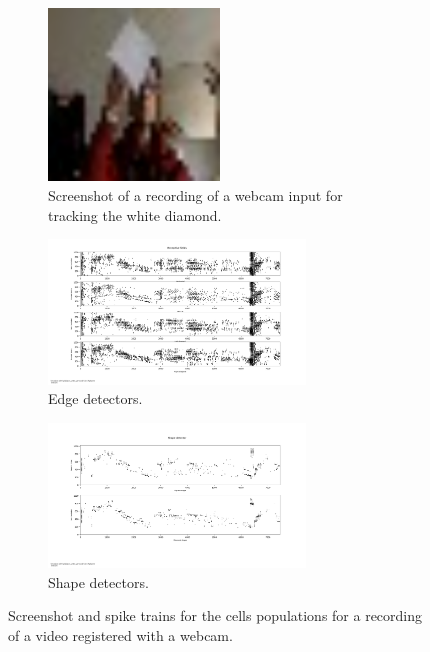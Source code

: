 \begin{figure}[ht]
\centering
\begin{subfigure}{0.45\textwidth}
\centering
\includegraphics[width=0.5\textwidth]{images/evaluation/webcam_input.png} 
\caption{Screenshot of a recording of a webcam input for tracking the white diamond.}
\label{fig:webcam_input}
\end{subfigure}

\begin{subfigure}{\textwidth}
\centering
\includegraphics[width=0.75\textwidth]{images/evaluation/receptive_fields_webcam_input.png}
\caption{Edge detectors.}
\label{fig:receptive_fields_webcam_input}
\end{subfigure}

\begin{subfigure}{\textwidth}
\centering
\includegraphics[width=0.75\textwidth]{images/evaluation/shape_webcam_input.png}
\caption{Shape detectors.}
\label{fig:shape_webcam_input}
\end{subfigure}

\caption[Webcam Input Results]{Screenshot and spike trains for the cells populations for a recording of a video registered with a webcam.}
\label{fig:webcam_results}
\end{figure}
